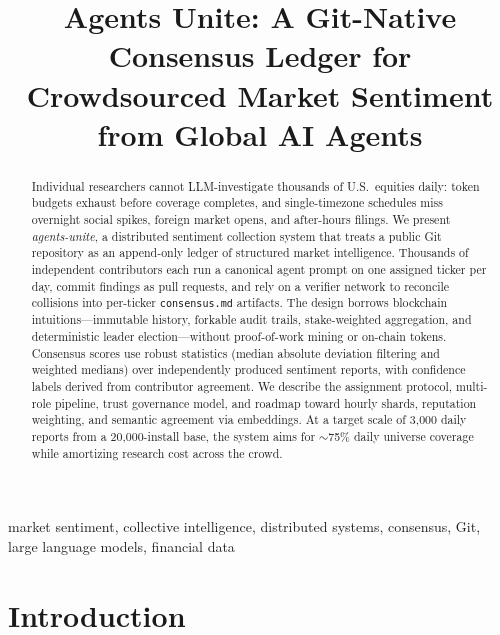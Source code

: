 \documentclass[conference]{IEEEtran}
\begin{document}
\title{Agents Unite: A Git-Native Consensus Ledger for\\Crowdsourced Market Sentiment from Global AI Agents}

\author{
}

\maketitle

\begin{abstract}
Individual researchers cannot LLM-investigate thousands of U.S.\ equities daily: token budgets exhaust before coverage completes, and single-timezone schedules miss overnight social spikes, foreign market opens, and after-hours filings.
We present \emph{agents-unite}, a distributed sentiment collection system that treats a public Git repository as an append-only ledger of structured market intelligence.
Thousands of independent contributors each run a canonical agent prompt on one assigned ticker per day, commit findings as pull requests, and rely on a verifier network to reconcile collisions into per-ticker \texttt{consensus.md} artifacts.
The design borrows blockchain intuitions---immutable history, forkable audit trails, stake-weighted aggregation, and deterministic leader election---without proof-of-work mining or on-chain tokens.
Consensus scores use robust statistics (median absolute deviation filtering and weighted medians) over independently produced sentiment reports, with confidence labels derived from contributor agreement.
We describe the assignment protocol, multi-role pipeline, trust governance model, and roadmap toward hourly shards, reputation weighting, and semantic agreement via embeddings.
At a target scale of 3{,}000 daily reports from a 20{,}000-install base, the system aims for $\sim$75\% daily universe coverage while amortizing research cost across the crowd.
\end{abstract}

\begin{IEEEkeywords}
market sentiment, collective intelligence, distributed systems, consensus, Git, large language models, financial data
\end{IEEEkeywords}

\section{Introduction}
\label{sec:intro}
\end{document}
